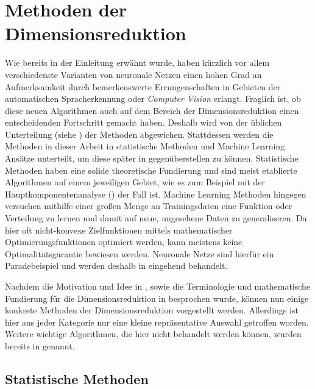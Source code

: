 \chapter{Methoden der Dimensionsreduktion}
\label{ch:MethodenDerDimRed}

Wie bereits in der Einleitung erwähnt wurde, haben kürzlich vor allem verschiedenste Varianten von
neuronale Netzen einen hohen Grad an Aufmerksamkeit durch bemerkenswerte Errungenschaften in
Gebieten der automatischen Spracherkennung oder \textit{Computer Vision} erlangt. Fraglich ist, ob
diese neuen Algorithmen auch auf dem Bereich der Dimensionsreduktion einen entscheidenden
Fortschritt gemacht haben. Deshalb wird von der üblichen Unterteilung (siehe
) der Methoden abgewichen. Stattdessen werden die Methoden
in dieser Arbeit in statistische Methoden und Machine Learning Ansätze unterteilt, um diese später
in  gegenüberstellen zu können. Statistische Methoden haben eine solide
theoretische Fundierung und sind meist etablierte Algorithmen auf einem jeweiligen Gebiet, wie es
zum Beispiel mit der Hauptkomponentenanalyse () der
Fall ist. Machine Learning Methoden hingegen versuchen mithilfe einer großen Menge an
Trainingsdaten eine Funktion oder Verteilung zu lernen und damit auf neue, ungesehene Daten zu
generaliseren. Da hier oft nicht-konvexe Zielfunktionen mittels mathematischer
Optimierungsfunktionen optimiert werden, kann meistens keine Optimalitätsgarantie bewiesen werden.
Neuronale Netze sind hierfür ein Paradebeispiel und werden deshalb in
 eingehend behandelt.

Nachdem die Motivation und Idee in , sowie die Terminologie und mathematische
Fundierung für die Dimensionsreduktion in  besprochen wurde, können
nun einige konkrete Methoden der Dimensionsreduktion vorgestellt werden. Allerdings ist hier aus
jeder Kategorie nur eine kleine repräsentative Auswahl getroffen worden. Weitere wichtige
Algorithmen, die hier nicht behandelt werden können, wurden bereits in
 genannt.

\section{Statistische Methoden}
\label{ch:MethodenDerDimRed:statistisch}

